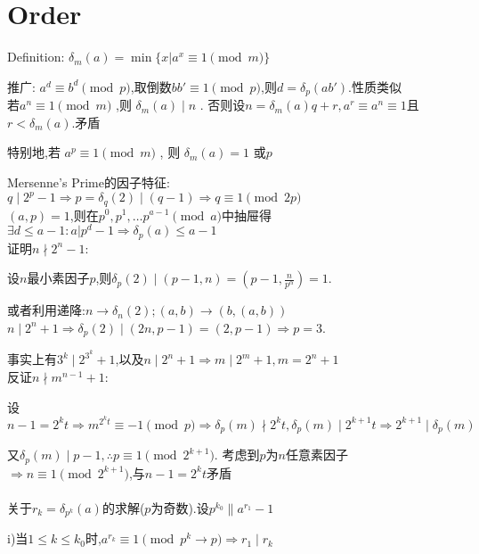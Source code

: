 
\section{Order}
Definition: $  \delta_m(a)=\min \{x|a^x \equiv 1 \pmod m\} $ 

推广: $ a^d\equiv b^d \pmod p$,取倒数$ bb'\equiv1\pmod p$,则$ d=\delta_p(ab')$.性质类似
\\

若$ a^n \equiv 1 \pmod m$ ,则 $ \delta_m(a)\mid n $ .
否则设$ n=\delta_m(a)q+r,a^r \equiv a^n \equiv 1 $且$ r<\delta_m(a)$.矛盾

特别地,若 $ a^p\equiv 1 \pmod m$ , 则 $ \delta_m(a)=1 $ 或$ p$ 

Mersenne's Prime的因子特征:$ q\mid 2^p-1\Rightarrow p=\delta_q(2)\mid (q-1)\Rightarrow q\equiv 1 \pmod{2p} $ 
\\

$ (a,p)=1$,则在$ p^0,p^1,\ldots p^{a-1} \pmod a$中抽屉得 $ \exists d \le a-1: a|p^d-1\Rightarrow \delta_p(a)\le a-1$
\\

证明$ n \nmid 2^n-1$:

设$ n$最小素因子$ p$,则$ \delta_p(2) \mid (p-1,n)=(p-1,\frac{n}{p^{\alpha}})=1$.

或者利用递降:$ n\rightarrow \delta_n(2) ; (a,b)\rightarrow (b,(a,b))$
\\

$ n\mid 2^n+1\Rightarrow \delta_p(2)\mid (2n,p-1)=(2,p-1)\Rightarrow p=3$.

事实上有$ 3^k \mid 2^{3^k}+1$,以及$ n\mid 2^n+1 \Rightarrow m\mid 2^m+1,m=2^n+1$
\\

反证$ n \nmid m^{n-1}+1$:

设$ n-1=2^kt\Rightarrow m^{2^kt}\equiv -1 \pmod p\Rightarrow \delta_p(m)\nmid 2^kt,\delta_p(m)\mid 2^{k+1}t\Rightarrow 2^{k+1}\mid\delta_p(m)$

又$ \delta_p(m)\mid p-1,\therefore p \equiv 1 \pmod{2^{k+1}}.$
考虑到$ p$为$ n$任意素因子$ \Rightarrow n\equiv 1 \pmod{2^{k+1}}$,与$ n-1=2^kt$矛盾
\\
\\

关于$ r_k=\delta_{p^k}(a)$的求解($ p$为奇数).设$ p^{k_0}\parallel a^{r_1}-1$

i)当$ 1\le k \le k_0$时,$ a^{r_k}\equiv1 \pmod{p^k \rightarrow p}\Rightarrow r_1\mid r_k$

